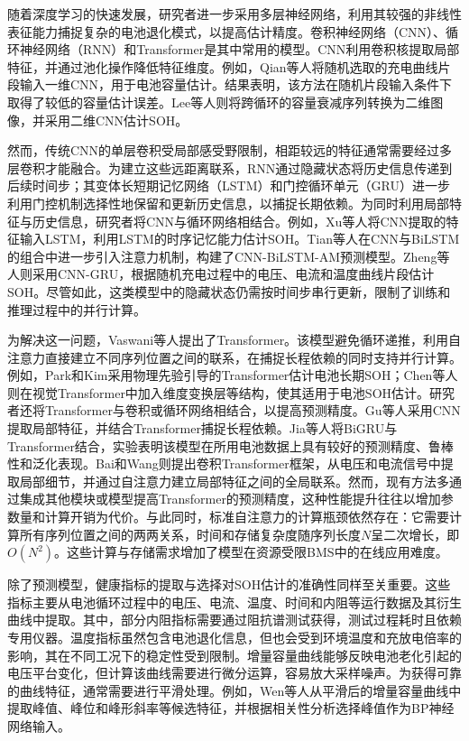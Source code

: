 随着深度学习的快速发展，研究者进一步采用多层神经网络，利用其较强的非线性表征能力捕捉复杂的电池退化模式，以提高估计精度\cite{ref14}。卷积神经网络（CNN）、循环神经网络（RNN）和Transformer是其中常用的模型。CNN利用卷积核提取局部特征，并通过池化操作降低特征维度。例如，Qian等人\cite{ref29}将随机选取的充电曲线片段输入一维CNN，用于电池容量估计。结果表明，该方法在随机片段输入条件下取得了较低的容量估计误差。Lee等人\cite{ref30}则将跨循环的容量衰减序列转换为二维图像，并采用二维CNN估计SOH。

然而，传统CNN的单层卷积受局部感受野限制，相距较远的特征通常需要经过多层卷积才能融合\cite{ref31}。为建立这些远距离联系，RNN通过隐藏状态将历史信息传递到后续时间步；其变体长短期记忆网络（LSTM）和门控循环单元（GRU）进一步利用门控机制选择性地保留和更新历史信息，以捕捉长期依赖\cite{ref14}。为同时利用局部特征与历史信息，研究者将CNN与循环网络相结合。例如，Xu等人\cite{ref41}将CNN提取的特征输入LSTM，利用LSTM的时序记忆能力估计SOH。Tian等人\cite{ref42}在CNN与BiLSTM的组合中进一步引入注意力机制，构建了CNN-BiLSTM-AM预测模型。Zheng等人\cite{ref33}则采用CNN-GRU，根据随机充电过程中的电压、电流和温度曲线片段估计SOH。尽管如此，这类模型中的隐藏状态仍需按时间步串行更新，限制了训练和推理过程中的并行计算\cite{ref31}。

为解决这一问题，Vaswani等人\cite{ref34}提出了Transformer。该模型避免循环递推，利用自注意力直接建立不同序列位置之间的联系，在捕捉长程依赖的同时支持并行计算。例如，Park和Kim\cite{ref38}采用物理先验引导的Transformer估计电池长期SOH；Chen等人\cite{ref37}则在视觉Transformer中加入维度变换层等结构，使其适用于电池SOH估计。研究者还将Transformer与卷积或循环网络相结合，以提高预测精度。Gu等人\cite{ref35}采用CNN提取局部特征，并结合Transformer捕捉长程依赖。Jia等人\cite{ref32}将BiGRU与Transformer结合，实验表明该模型在所用电池数据上具有较好的预测精度、鲁棒性和泛化表现。Bai和Wang\cite{ref36}则提出卷积Transformer框架，从电压和电流信号中提取局部细节，并通过自注意力建立局部特征之间的全局联系。然而，现有方法多通过集成其他模块或模型提高Transformer的预测精度，这种性能提升往往以增加参数量和计算开销为代价\cite{ref31}。与此同时，标准自注意力的计算瓶颈依然存在：它需要计算所有序列位置之间的两两关系，时间和存储复杂度随序列长度$N$呈二次增长，即$O(N^2)$\cite{ref39,ref40}。这些计算与存储需求增加了模型在资源受限BMS中的在线应用难度\cite{ref31}。

除了预测模型，健康指标的提取与选择对SOH估计的准确性同样至关重要。这些指标主要从电池循环过程中的电压、电流、温度、时间和内阻等运行数据及其衍生曲线中提取\cite{ref47,ref48,ref49,ref50}。其中，部分内阻指标需要通过阻抗谱测试获得，测试过程耗时且依赖专用仪器\cite{ref64}。温度指标虽然包含电池退化信息，但也会受到环境温度和充放电倍率的影响，其在不同工况下的稳定性受到限制\cite{ref64}。增量容量曲线能够反映电池老化引起的电压平台变化，但计算该曲线需要进行微分运算，容易放大采样噪声。为获得可靠的曲线特征，通常需要进行平滑处理\cite{ref28,ref50}。例如，Wen等人\cite{ref50}从平滑后的增量容量曲线中提取峰值、峰位和峰形斜率等候选特征，并根据相关性分析选择峰值作为BP神经网络输入。

